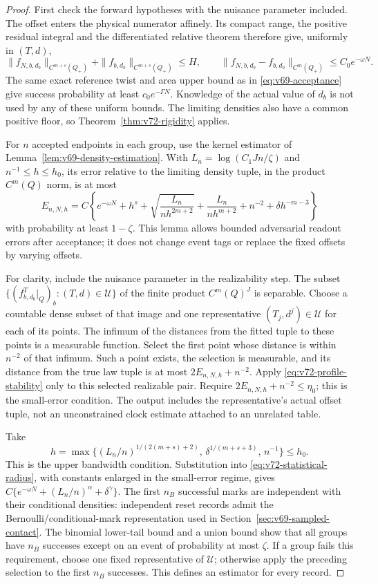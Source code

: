 \begin{proof}
First check the forward hypotheses with the nuisance parameter included.
The offset enters the physical numerator affinely.  Its compact range,
the positive residual integral and the differentiated relative theorem
therefore give, uniformly in $(T,d)$,
\[
 \|f_{N,b,d_b}\|_{C^{m+s}(Q_+)}+\|f_{b,d_b}\|_{C^{m+s}(Q_+)}\le H,
 \qquad \|f_{N,b,d_b}-f_{b,d_b}\|_{C^m(Q_+)}\le C_0e^{-\omega N}.
\]
The same exact reference twist and area upper bound as in
\eqref{eq:v69-acceptance} give success probability at least
$c_0e^{-\Gamma N}$.  Knowledge of the actual value of $d_b$ is not
used by any of these uniform bounds.  The limiting densities also have
a common positive floor, so Theorem~\ref{thm:v72-rigidity} applies.

For $n$ accepted endpoints in each group, use the kernel estimator of
Lemma~\ref{lem:v69-density-estimation}.  With
$L_n=\log(C_1Jn/\zeta)$ and $n^{-1}\le h\le h_0$, its error relative
to the limiting density tuple, in the product $C^m(Q)$ norm, is at most
\begin{equation}\label{eq:v72-statistical-radius}
 E_{n,N,h}=C\left\{e^{-\omega N}+h^s+
 \sqrt{\frac{L_n}{nh^{2m+2}}}+\frac{L_n}{nh^{m+2}}+
 n^{-2}+\delta h^{-m-3}\right\}
\end{equation}
with probability at least $1-\zeta$.  This lemma allows bounded
adversarial readout errors after acceptance; it does not change event
tags or replace the fixed offsets by varying offsets.

For clarity, include the nuisance parameter in the realizability step.
The subset
$\{(f^T_{b,d_b}|_Q)_b:(T,d)\in\mathscr U\}$ of the finite product
$C^m(Q)^J$ is separable.  Choose a countable dense subset of that image
and one representative $(T_j,d^j)\in\mathscr U$ for each of its points.
The infimum of the distances from the fitted tuple to these points is a
measurable function.  Select the first point whose distance is within
$n^{-2}$ of that infimum.  Such a point exists, the selection is
measurable, and its distance from the true law tuple is at most
$2E_{n,N,h}+n^{-2}$.  Apply \eqref{eq:v72-profile-stability} only to
this selected realizable pair.  Require
$2E_{n,N,h}+n^{-2}\le\eta_0$; this is the small-error condition.
The output includes the representative's actual offset tuple, not an
unconstrained clock estimate attached to an unrelated table.

Take
\[
 h=\max\{(L_n/n)^{1/(2(m+s)+2)},\,
                   \delta^{1/(m+s+3)},\,n^{-1}\}\le h_0.
\]
This is the upper bandwidth condition.  Substitution into
\eqref{eq:v72-statistical-radius}, with constants enlarged in the
small-error regime, gives
$C\{e^{-\omega N}+(L_n/n)^\alpha+\delta^\gamma\}$.
The first $n_B$ successful marks are independent with their conditional
densities: independent reset records admit the Bernoulli/conditional-mark
representation used in Section~\ref{sec:v69-sampled-contact}.
The binomial lower-tail bound and a union bound show that all groups
have $n_B$ successes except on an event of probability at most $\zeta$.
If a group fails this requirement, choose one fixed representative of
$\mathscr U$; otherwise apply the preceding selection to the first
$n_B$ successes.  This defines an estimator for every record.


\end{proof}
